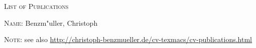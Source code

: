 \documentclass{article}
\begin{document}




\begin{center}
{\LARGE \textsc{List of Publications}}
\end{center}

\vspace*{1em}

\textsc{Name:} \quad Benzm"uller, Christoph 

\textsc{Note:} \quad see also  \url{http://christoph-benzmueller.de/cv-texmacs/cv-publications.html}

\vspace*{1em}

\def\refname{\fontseries{m}\selectfont \textsc{\large Journals}}

\def\refname{\fontseries{m}\selectfont \textsc{\large Conference Papers}}

\def\refname{\fontseries{m}\selectfont \textsc{\large Books and Chapters in Books}}

\def\refname{\fontseries{m}\selectfont \textsc{\large Edited Proceedings and Edited Books}}

\def\refname{\fontseries{m}\selectfont \textsc{\large Workshop Papers}}

\def\refname{\fontseries{m}\selectfont \textsc{\large Thesis}}

\def\refname{\fontseries{m}\selectfont \textsc{\large Technical Reports and Other Papers}}

\end{document}
